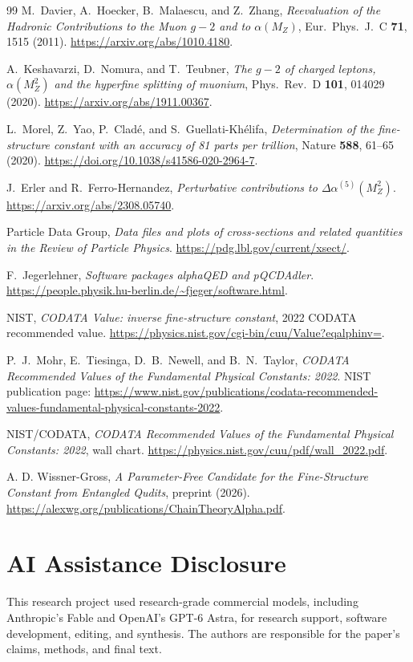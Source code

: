 \documentclass[11pt]{article}
\theoremstyle{remark}
\begin{document}
\begin{thebibliography}{99}
M.\ Davier, A.\ Hoecker, B.\ Malaescu, and Z.\ Zhang,
\emph{Reevaluation of the Hadronic Contributions to the Muon \(g-2\) and to \(\alpha(M_Z)\)},
Eur.\ Phys.\ J.\ C \textbf{71}, 1515 (2011).
\url{https://arxiv.org/abs/1010.4180}.

A.\ Keshavarzi, D.\ Nomura, and T.\ Teubner,
\emph{The \(g-2\) of charged leptons, \(\alpha(M_Z^2)\) and the hyperfine splitting of muonium},
Phys.\ Rev.\ D \textbf{101}, 014029 (2020).
\url{https://arxiv.org/abs/1911.00367}.

L.\ Morel, Z.\ Yao, P.\ Cladé, and S.\ Guellati-Khélifa,
\emph{Determination of the fine-structure constant with an accuracy of 81 parts per trillion},
Nature \textbf{588}, 61--65 (2020).
\url{https://doi.org/10.1038/s41586-020-2964-7}.

J.\ Erler and R.\ Ferro-Hernandez,
\emph{Perturbative contributions to \(\Delta\alpha^{(5)}(M_Z^2)\)}.
\url{https://arxiv.org/abs/2308.05740}.

Particle Data Group,
\emph{Data files and plots of cross-sections and related quantities in the Review of Particle Physics}.
\url{https://pdg.lbl.gov/current/xsect/}.

F.\ Jegerlehner,
\emph{Software packages alphaQED and pQCDAdler}.
\url{https://people.physik.hu-berlin.de/~fjeger/software.html}.

NIST,
\emph{CODATA Value: inverse fine-structure constant},
2022 CODATA recommended value.
\url{https://physics.nist.gov/cgi-bin/cuu/Value?eqalphinv=}.

P.\ J.\ Mohr, E.\ Tiesinga, D.\ B.\ Newell, and B.\ N.\ Taylor,
\emph{CODATA Recommended Values of the Fundamental Physical Constants: 2022}.
NIST publication page:
\url{https://www.nist.gov/publications/codata-recommended-values-fundamental-physical-constants-2022}.

NIST/CODATA,
\emph{CODATA Recommended Values of the Fundamental Physical Constants: 2022},
wall chart.
\url{https://physics.nist.gov/cuu/pdf/wall_2022.pdf}.

A. D. Wissner-Gross, \emph{A Parameter-Free Candidate for the Fine-Structure
Constant from Entangled Qudits}, preprint (2026).
\url{https://alexwg.org/publications/ChainTheoryAlpha.pdf}.

\end{thebibliography}

\section*{AI Assistance Disclosure}
This research project used research-grade commercial models, including
Anthropic's Fable and OpenAI's GPT-6 Astra, for research support, software
development, editing, and synthesis. The authors are responsible for the
paper's claims, methods, and final text.
\end{document}
